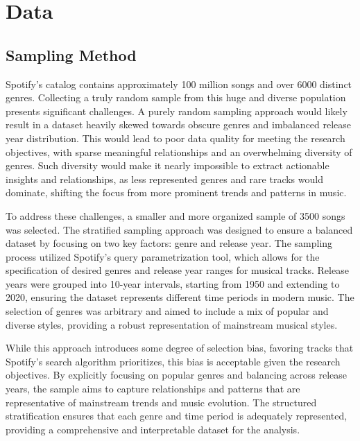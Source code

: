 \chapter{Data}
\label{cha:data}



\section{Sampling Method}
\label{sec:samplingmethod}


Spotify’s catalog contains approximately 100 million songs and over 6000
distinct genres. Collecting a truly random sample from this huge and diverse
population presents significant challenges. A purely random sampling approach
would likely result in a dataset heavily skewed towards obscure genres and
imbalanced release year distribution. This would lead to poor data quality for
meeting the research objectives, with sparse meaningful relationships and an
overwhelming diversity of genres. Such diversity would make it nearly
impossible to extract actionable insights and relationships, as less
represented genres and rare tracks would dominate, shifting the focus from more
prominent trends and patterns in music.


To address these challenges, a smaller and more organized sample of 3500 songs
was selected. The stratified sampling approach was designed to ensure a
balanced dataset by focusing on two key factors: genre and release year. The
sampling process utilized Spotify's query parametrization tool, which allows
for the specification of desired genres and release year ranges for musical
tracks. Release years were grouped into 10-year intervals, starting from 1950
and extending to 2020, ensuring the dataset represents different time periods
in modern music. The selection of genres was arbitrary and aimed to include a
mix of popular and diverse styles, providing a robust representation of
mainstream musical styles.
 

While this approach introduces some degree of selection bias, favoring tracks
that Spotify's search algorithm prioritizes, this bias is acceptable given the
research objectives. By explicitly focusing on popular genres and balancing
across release years, the sample aims to capture relationships and patterns
that are representative of mainstream trends and music evolution. The
structured stratification ensures that each genre and time period is adequately
represented, providing a comprehensive and interpretable dataset for  the
analysis.


